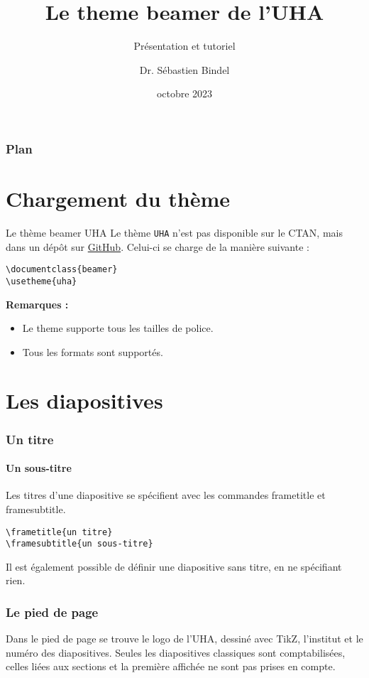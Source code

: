 \documentclass[]{beamer}
\title{Le theme beamer de l'UHA}
\subtitle{Présentation et tutoriel}
\date{octobre 2023}
\author{Dr. Sébastien Bindel}
\institute{Université de Haute Alsace}
\begin{document}
\begin{frame}
	\titlepage
\end{frame}

\begin{frame}
	\titlepage
\end{frame}

\begin{frame}
	\frametitle{Plan}
	\tableofcontents
\end{frame}

\section{Chargement du thème}
%
\begin{frame}[fragile]{Le thème beamer UHA}
	Le thème  \alert{\texttt{UHA}} n'est pas disponible sur le CTAN, mais dans un dépôt sur \href{https://github.com/sbindel/beamer-theme-uha}{GitHub}. Celui-ci se charge de la manière suivante :
	\begin{lstlisting}[frame=single]
\documentclass{beamer}
\usetheme{uha}
	\end{lstlisting}

	\textbf{Remarques :}
	\begin{itemize}
		\item Le theme supporte tous les tailles de police.
		\item Tous les formats sont supportés.
	\end{itemize}
\end{frame}
%
\section{Les diapositives}

\begin{frame}[fragile]
	\frametitle{Un titre}
	\framesubtitle{Un sous-titre}
	Les titres d'une diapositive se spécifient avec les commandes \alert{frametitle} et \alert{framesubtitle}.

		\begin{lstlisting}[frame=single]
\frametitle{un titre}
\framesubtitle{un sous-titre}
	\end{lstlisting}
	Il est également possible de définir une diapositive sans titre, en ne spécifiant rien.
\end{frame}

\begin{frame}
	\frametitle{Le pied de page}
	Dans le pied de page se trouve le logo de l'UHA, dessiné avec TikZ, l'institut et le numéro des diapositives. Seules les diapositives classiques sont comptabilisées, celles liées aux sections et la première affichée ne sont pas prises en compte.
\end{frame}
\end{document}
